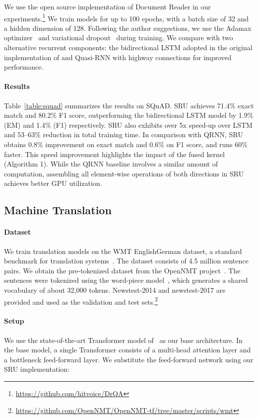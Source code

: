 \documentclass[11pt,a4paper]{article}
\newcommand{\yae}[2]{{#1}{#2}}
\begin{document}
We use the open source implementation of Document Reader in our experiments.\footnote{\url{https://github.com/hitvoice/DrQA}}
We train models for up to 100 epochs, with a batch size of 32 and a hidden dimension of 128.
Following the author suggestions, we use the Adamax optimizer~\citep{Kingma:14adam} and variational dropout~\citep{Gal2016Theoretically} during training.
We compare with two alternative recurrent components:
the bidirectional LSTM adopted in the original implementation of \citet{chen2017reading} and Quasi-RNN with highway connections for improved performance.


\paragraph{Results}
Table~\ref{table:squad} summarizes the results on SQuAD.
SRU achieves 71.4\% exact match and 80.2\% F1 score, outperforming the bidirectional LSTM model by 1.9\% (EM) and 1.4\% (F1) respectively. 
SRU also exhibits over 5x speed-up over LSTM and 53--63\% reduction in total training time.
In comparison with QRNN, SRU obtains 0.8\% improvement on exact match and 0.6\% on F1 score, and runs 60\% faster.
\yae{This speed improvement highlights the impact of the fused kernel (Algorithm 1).
While the QRNN baseline involves a similar amount of computation, assembling all element-wise operations of both directions in SRU achieves better GPU utilization.}{}

\subsection{Machine Translation}
\label{sec:exp:mt}

\paragraph{Dataset}
We train translation models on the WMT EnglishGerman dataset, a standard benchmark for translation systems~\citep{peitz-EtAl,li-EtAl:2014,jean15}.
The dataset consists of 4.5 million sentence pairs.
We obtain the pre-tokenized dataset from the OpenNMT project~\citep{opennmt17}.
The sentences were tokenized using the word-piece model~\citep{wu2016gnmt}, which generates a shared vocabulary of about 32,000 tokens.
Newstest-2014 and newstest-2017 are provided and used as the validation and test sets.\footnote{\url{https://github.com/OpenNMT/OpenNMT-tf/tree/master/scripts/wmt}}


\paragraph{Setup}
We use the state-of-the-art Transformer model of~\citet{vaswani2017attention} as our base architecture.
In the base model, a single Transformer consists of a multi-head attention layer and a bottleneck feed-forward layer.
We substitute the feed-forward network using our SRU implementation:
\end{document}
